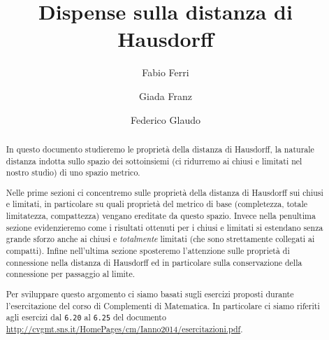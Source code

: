 \documentclass[a4paper,12pt]{article}
\title{Dispense sulla distanza di Hausdorff}
\author{Fabio Ferri \and Giada Franz \and Federico Glaudo}
\begin{document}
\maketitle


\begin{abstract}
	In questo documento studieremo le proprietà della distanza di Hausdorff, la naturale distanza indotta sullo spazio dei sottoinsiemi (ci ridurremo ai chiusi e limitati nel nostro studio) di uno spazio metrico. 
	
	Nelle prime sezioni ci concentremo sulle proprietà della distanza di Hausdorff sui chiusi e limitati, in particolare su quali proprietà del metrico di base (completezza, totale limitatezza, compattezza) vengano ereditate da questo spazio. 
	Invece nella penultima sezione evidenzieremo come i risultati ottenuti per i chiusi e limitati si estendano senza grande sforzo anche ai chiusi e \emph{totalmente} limitati (che sono strettamente collegati ai compatti).
	Infine nell'ultima sezione sposteremo l'attenzione sulle proprietà di connessione nella distanza di Hausdorff ed in particolare sulla conservazione della connessione per passaggio al limite.

	Per sviluppare questo argomento ci siamo basati sugli esercizi proposti durante l'esercitazione del corso di Complementi di Matematica. In particolare ci siamo riferiti agli esercizi dal \texttt{6.20} al \texttt{6.25} del documento \url{http://cvgmt.sns.it/HomePages/cm/Ianno2014/esercitazioni.pdf}.
\end{abstract}
\clearpage







\end{document}
